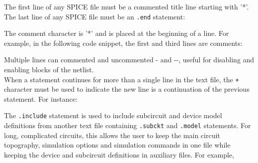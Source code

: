 The first line of any SPICE file must be a commented title line starting with '*'.  The last line of any SPICE file must be an \texttt{.end} statement: 


 The comment character is '*' and is placed at the beginning of a line. For example, in the following code snippet, the first and third lines are comments:


Multiple lines can commented and uncommented - and --, useful for disabling and enabling blocks of the netlist.\\


 When a statement continues for more than a single line in the text file, the \texttt{+} character must be used to indicate the new line is a continuation of the previous statement. For instance:



 The \texttt{.include} statement is used to include subcircuit and device model definitions from another text file containing \texttt{.subckt} and \texttt{.model} statements. For long, complicated circuits, this allows the user to keep the main circuit topography, simulation options and simulation commands in one file while keeping the device and subcircuit definitions in auxiliary files.  For example, 

 
